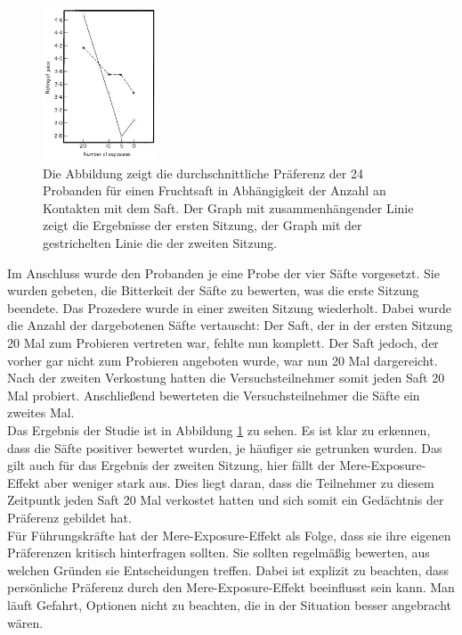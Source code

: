  \begin{figure}[htbp]
	\begin{center}
		\includegraphics[width=0.3\textwidth]{Bilder/exposure-effekt.jpg}
		\caption{Die Abbildung zeigt die durchschnittliche Präferenz der 24 Probanden für einen Fruchtsaft in Abhängigkeit der Anzahl an Kontakten mit dem Saft. Der Graph mit zusammenhängender Linie zeigt die Ergebnisse der ersten Sitzung, der Graph mit der gestrichelten Linie die der zweiten Sitzung.}
		\label{fig:mere-exposure-effekt}
	\end{center}
\end{figure}

Im Anschluss wurde den Probanden je eine Probe der vier Säfte vorgesetzt. Sie wurden gebeten, die Bitterkeit der Säfte zu bewerten, was die erste Sitzung beendete. Das Prozedere wurde in einer zweiten Sitzung wiederholt. Dabei wurde die Anzahl der dargebotenen Säfte vertauscht: Der Saft, der in der ersten Sitzung 20 Mal zum Probieren vertreten war, fehlte nun komplett. Der Saft jedoch, der vorher gar nicht zum Probieren angeboten wurde, war nun 20 Mal dargereicht. Nach der zweiten Verkostung hatten die Versuchsteilnehmer somit jeden Saft 20 Mal probiert. Anschließend bewerteten die Versuchsteilnehmer die Säfte ein zweites Mal. \\

Das Ergebnis der Studie ist in Abbildung \ref{fig:mere-exposure-effekt} zu sehen. Es ist klar zu erkennen, dass die Säfte positiver bewertet wurden, je häufiger sie getrunken wurden. Das gilt auch für das Ergebnis der zweiten Sitzung, hier fällt der Mere-Exposure-Effekt aber weniger stark aus. Dies liegt daran, dass die Teilnehmer zu diesem Zeitpuntk jeden Saft 20 Mal verkostet hatten und sich somit ein Gedächtnis der Präferenz gebildet hat. \\

Für Führungskräfte hat der Mere-Exposure-Effekt als Folge, dass sie ihre eigenen Präferenzen kritisch hinterfragen sollten. Sie sollten regelmäßig bewerten, aus welchen Gründen sie Entscheidungen treffen. Dabei ist explizit zu beachten, dass persönliche Präferenz durch den Mere-Exposure-Effekt beeinflusst sein kann. Man läuft Gefahrt, Optionen nicht zu beachten, die in der Situation besser angebracht wären. \\

